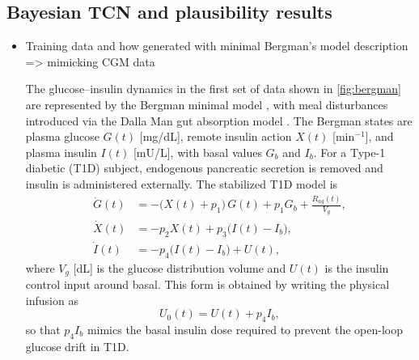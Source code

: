 \documentclass[preprint,12pt]{elsarticle}
\begin{document}
\subsection{Bayesian TCN and plausibility results}
\begin{itemize}
    \item Training data and how generated with minimal Bergman’s model description => mimicking CGM data

The glucose--insulin dynamics in the first set of data shown in \autoref{fig:bergman} are represented by the Bergman minimal model \cite{bergman1981physiologic}, with meal disturbances introduced via the Dalla Man gut absorption model \cite{dalla2006system}. The Bergman states are plasma glucose $G(t)$ [mg/dL], remote insulin action $X(t)$ [min$^{-1}$], and plasma insulin $I(t)$ [mU/L], with basal values $G_b$ and $I_b$. For a Type-1 diabetic (T1D) subject, endogenous pancreatic secretion is removed and insulin is administered externally. The stabilized T1D model is
\begin{align}
\dot G(t) &= -\big(X(t)+p_1\big)\,G(t) + p_1 G_b + \frac{R_{ag}(t)}{V_g}, \label{eq:t1d_bergman_G}\\
\dot X(t) &= -p_2 X(t) + p_3\big(I(t)-I_b\big), \label{eq:t1d_bergman_X}\\
\dot I(t) &= -p_4\big(I(t)-I_b\big) + U(t), \label{eq:t1d_bergman_I}
\end{align}
where $V_g$ [dL] is the glucose distribution volume and $U(t)$ is the insulin control input around basal. This form is obtained by writing the physical infusion as
\begin{equation}
U_0(t) = U(t) + p_4 I_b,
\end{equation}
so that $p_4 I_b$ mimics the basal insulin dose required to prevent the open-loop glucose drift in T1D.


\end{itemize}
\end{document}
